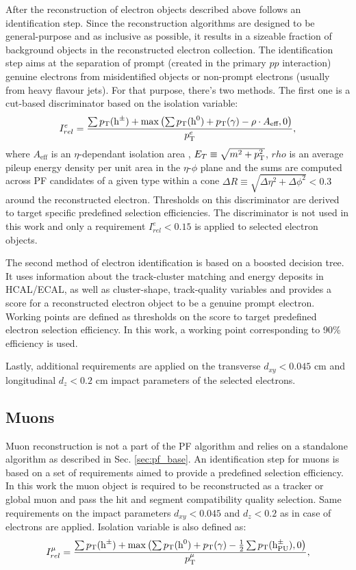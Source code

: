 After the reconstruction of electron objects described above follows an identification step. Since the reconstruction algorithms are designed to be general-purpose and as inclusive as possible, it results in a sizeable fraction of background objects in the reconstructed electron collection. The identification step aims at the separation of prompt (created in the primary $pp$ interaction) genuine electrons from misidentified objects or non-prompt electrons (usually from heavy flavour jets). For that purpose, there's two methods. The first one is a cut-based discriminator based on the isolation variable:
\begin{equation}\label{eq:iso_e}
    I^e_{rel} = \dfrac{\sum p_{\text{T}}(\text{h}^\pm) + \max\left(\sum p_{\text{T}}(\text{h}^0) + p_{\text{T}}(\gamma) - \rho \cdot A_\text{eff}, 0\right)}{p_{\text{T}}^e},
\end{equation}
where $A_\text{eff}$ is an $\eta$-dependant isolation area \cite{CMS:2015xaf}, $E_T \equiv \sqrt{m^2 + p_{\text{T}}^2}$, $rho$ is an average pileup energy density per unit area in the $\eta$-$\phi$ plane and the sums are computed across PF candidates of a given type within a cone $\Delta R \equiv \sqrt{\Delta\eta^2+\Delta\phi^2}< 0.3$ around the reconstructed electron. Thresholds on this discriminator are derived to target specific predefined selection efficiencies. The discriminator is not used in this work and only a requirement $I^e_{rel} < 0.15$ is applied to selected electron objects. 

The second method of electron identification is based on a boosted decision tree. It uses information about the track-cluster matching and energy deposits in HCAL/ECAL, as well as cluster-shape, track-quality variables and provides a score for a reconstructed electron object to be a genuine prompt electron. Working points are defined as thresholds on the score to target predefined electron selection efficiency. In this work, a working point corresponding to 90\% efficiency is used.

Lastly, additional requirements are applied on the transverse $d_{xy} < 0.045$ cm and longitudinal $d_z < 0.2$ cm impact parameters of the selected electrons.

\subsection{Muons}
Muon reconstruction is not a part of the PF algorithm and relies on a standalone algorithm as described in Sec. \ref{sec:pf_base}. An identification step for muons is based on a set of requirements aimed to provide a predefined selection efficiency. In this work the muon object is required to be reconstructed as a tracker or global muon and pass the hit and segment compatibility quality selection. Same requirements on the impact parameters $d_{xy} < 0.045$ and $d_z < 0.2$ as in case of electrons are applied. Isolation variable is also defined as:
\begin{equation}\label{eq:iso_mu}
    I^\mu_{rel} = \dfrac{\sum p_{\text{T}}(\text{h}^\pm) + \max\left(\sum p_{\text{T}}(\text{h}^0) + p_{\text{T}}(\gamma) - \frac{1}{2}\sum p_{\text{T}}(\text{h}^\pm_{\text{PU}}), 0\right)}{p_{\text{T}}^\mu},
\end{equation}

